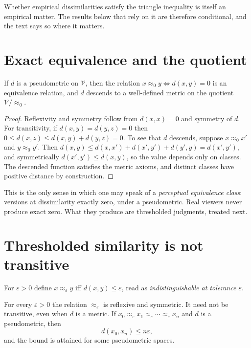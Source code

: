 Whether empirical dissimilarities satisfy the triangle inequality is itself an empirical matter. The results below that rely on it are therefore conditional, and the text says so where it matters.

\section{Exact equivalence and the quotient}

\begin{proposition}\label{prop:quotient}
If $d$ is a pseudometric on $\mathcal{V}$, then the relation $x\approx_0y\iff d(x,y)=0$ is an equivalence relation, and $d$ descends to a well-defined metric on the quotient $\mathcal{V}/{\approx_0}$.
\end{proposition}

\begin{proof}
Reflexivity and symmetry follow from $d(x,x)=0$ and symmetry of $d$. For transitivity, if $d(x,y)=d(y,z)=0$ then $0\le d(x,z)\le d(x,y)+d(y,z)=0$. To see that $d$ descends, suppose $x\approx_0x'$ and $y\approx_0y'$. Then $d(x,y)\le d(x,x')+d(x',y')+d(y',y)=d(x',y')$, and symmetrically $d(x',y')\le d(x,y)$, so the value depends only on classes. The descended function satisfies the metric axioms, and distinct classes have positive distance by construction.
\end{proof}

This is the only sense in which one may speak of a \emph{perceptual equivalence class}: versions at dissimilarity exactly zero, under a pseudometric. Real viewers never produce exact zero. What they produce are thresholded judgments, treated next.

\section{Thresholded similarity is not transitive}

For $\varepsilon>0$ define $x\approx_\varepsilon y$ iff $d(x,y)\le\varepsilon$, read as \emph{indistinguishable at tolerance $\varepsilon$}.

\begin{proposition}\label{prop:nontransitive}
For every $\varepsilon>0$ the relation $\approx_\varepsilon$ is reflexive and symmetric. It need not be transitive, even when $d$ is a metric. If $x_0\approx_\varepsilon x_1\approx_\varepsilon\cdots\approx_\varepsilon x_n$ and $d$ is a pseudometric, then
\[
d(x_0,x_n)\le n\varepsilon,
\]
and the bound is attained for some pseudometric spaces.
\end{proposition}


